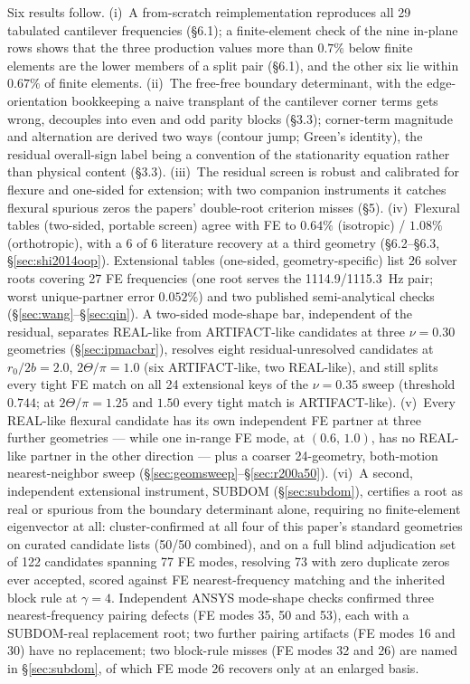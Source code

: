 \documentclass[11pt]{article}
\begin{document}
Six results follow. (i)~A from-scratch reimplementation reproduces all
29 tabulated cantilever frequencies (\S6.1); a finite-element check of
the nine in-plane rows shows that the three production values more than
$0.7\%$ below finite elements are the lower members of a split pair
(\S6.1), and the other six lie within $0.67\%$ of finite elements.
(ii)~The free-free boundary
determinant, with the edge-orientation bookkeeping a naive transplant of
the cantilever corner terms gets wrong, decouples into even and odd
parity blocks (\S3.3); corner-term magnitude and alternation are derived
two ways (contour jump; Green's identity), the residual overall-sign label
being a convention of the stationarity equation rather than physical
content (\S3.3). (iii)~The residual
screen is robust and calibrated for flexure and one-sided for extension;
with two companion instruments it catches flexural spurious zeros the
papers' double-root criterion misses (\S5). (iv)~Flexural tables
(two-sided, portable screen) agree with FE to $0.64\%$ (isotropic) /
$1.08\%$ (orthotropic), with a 6 of 6 literature recovery at a third
geometry (\S6.2--\S6.3, \S\ref{sec:shi2014oop}). Extensional tables
(one-sided, geometry-specific) list 26 solver roots covering 27 FE
frequencies (one root serves the 1114.9/1115.3~Hz pair; worst
unique-partner error $0.052\%$) and two published semi-analytical checks
(\S\ref{sec:wang}--\S\ref{sec:qin}). A two-sided mode-shape bar,
independent of the residual, separates REAL-like from ARTIFACT-like
candidates at three $\nu=0.30$ geometries (\S\ref{sec:ipmacbar}),
resolves eight residual-unresolved candidates at $r_0/2b=2.0$,
$2\Theta/\pi=1.0$ (six ARTIFACT-like, two REAL-like), and still splits
every tight FE match on all 24
extensional keys of the $\nu=0.35$ sweep (threshold $0.744$; at
$2\Theta/\pi=1.25$ and $1.50$ every tight match is ARTIFACT-like).
(v)~Every REAL-like flexural candidate has its own independent FE partner
at three further geometries --- while one in-range FE mode, at
$(0.6,\,1.0)$, has no REAL-like partner in the other direction --- plus a coarser
24-geometry, both-motion nearest-neighbor sweep
(\S\ref{sec:geomsweep}--\S\ref{sec:r200a50}). (vi)~A second, independent
extensional instrument, SUBDOM (\S\ref{sec:subdom}), certifies a root as
real or spurious from the boundary determinant alone, requiring no
finite-element eigenvector at all: cluster-confirmed at all four of this
paper's standard geometries on curated candidate lists (50/50 combined),
and on a full blind adjudication set of 122 candidates spanning 77 FE
modes, resolving 73 with zero duplicate zeros ever accepted, scored
against FE nearest-frequency matching and the inherited block rule at
$\gamma=4$. Independent ANSYS mode-shape checks confirmed three
nearest-frequency pairing defects (FE modes 35, 50 and 53), each with a
SUBDOM-real replacement root; two further pairing artifacts (FE modes
16 and 30) have no replacement; two block-rule misses (FE modes 32 and
26) are named in \S\ref{sec:subdom}, of which FE mode 26 recovers only
at an enlarged basis.
\end{document}
